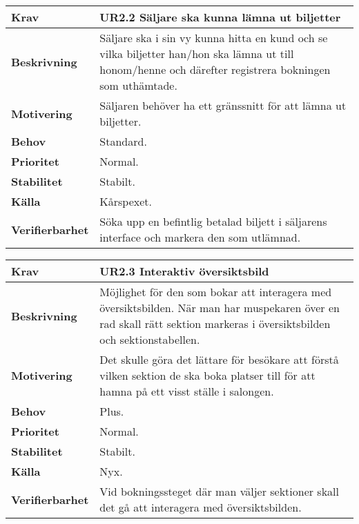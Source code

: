 \documentclass[a4paper, twoside, 11pt, titlepage]{article}
\begin{document}
		\begin {table} [ht] \begin{tabular} { p{2.6cm} p{12.5cm} }
			\hline
			{\sffamily\textbf{Krav}} & {\sffamily\textbf{UR2.2 Säljare ska kunna lämna ut biljetter }} \\
			\hline
			{\sffamily\textbf{Beskrivning}} & {Säljare ska i sin vy kunna hitta en kund och se vilka biljetter han/hon ska lämna ut till honom/henne och därefter registrera bokningen som uthämtade.} \\
			\hline
			{\sffamily\textbf{Motivering}} & {Säljaren behöver ha ett gränssnitt för att lämna ut biljetter.} \\
			\hline
			{\sffamily\textbf{Behov}} & {Standard.} \\
			\hline
			{\sffamily\textbf{Prioritet}} & {Normal.} \\
			\hline
			{\sffamily\textbf{Stabilitet}} & {Stabilt.} \\
			\hline
			{\sffamily\textbf{Källa}} & {Kårspexet.} \\
			\hline
			{\sffamily\textbf{Verifierbarhet}} & {Söka upp en befintlig betalad biljett i säljarens interface och markera den som utlämnad.} \\
			\hline
		\end{tabular} \end{table} \FloatBarrier
		\vspace{6mm}

		\begin {table} [ht] \begin{tabular} { p{2.6cm} p{12.5cm} }
			\hline
			{\sffamily\textbf{Krav}} & {\sffamily\textbf{UR2.3 Interaktiv översiktsbild }} \\
			\hline
			{\sffamily\textbf{Beskrivning}} & {Möjlighet för den som bokar att interagera med översiktsbilden. När man har muspekaren över en rad skall rätt sektion markeras i översiktsbilden och sektionstabellen.} \\
			\hline
			{\sffamily\textbf{Motivering}} & {Det skulle göra det lättare för besökare att förstå vilken sektion de ska boka platser till för att hamna på ett visst ställe i salongen.} \\
			\hline
			{\sffamily\textbf{Behov}} & {Plus.} \\
			\hline
			{\sffamily\textbf{Prioritet}} & {Normal.} \\
			\hline
			{\sffamily\textbf{Stabilitet}} & {Stabilt.} \\
			\hline
			{\sffamily\textbf{Källa}} & {Nyx.} \\
			\hline
			{\sffamily\textbf{Verifierbarhet}} & {Vid bokningssteget där man väljer sektioner skall det gå att interagera med översiktsbilden.} \\
			\hline
		\end{tabular} \end{table} \FloatBarrier
		\vspace{6mm}
\end{document}
